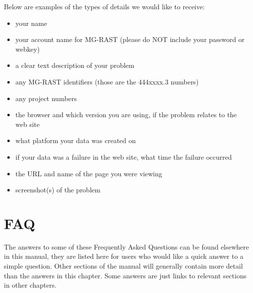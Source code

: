 \documentclass[12pt,fullpage]{report}
\begin{document}
Below are examples of the types of details we would like to receive:
\begin{itemize}
\item your name 
\item your account name for MG-RAST (please do NOT include your password or webkey)
\item a clear text description of your problem
\item any MG-RAST identifiers (those are the 444xxxx.3 numbers)
\item any project numbers
\item the browser and which version you are using, if the problem relates to the web site
\item what platform your data was created on
\item if your data was a failure in the web site, what time the failure occurred
\item the URL and name of the page you were viewing
\item screenshot(s) of the problem

\end{itemize}





\chapter{FAQ}
The answers to some of these Frequently Asked Questions can be found elsewhere in this manual, they are listed here for users who would like  a quick answer to a simple question. Other sections of the manual will generally contain more detail than the answers in this chapter. Some answers are just links to relevant sections in other chapters.
\end{document}
